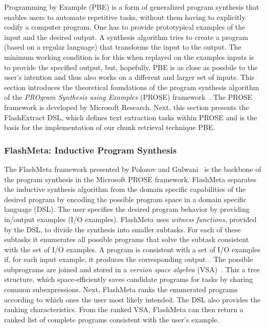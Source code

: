 Programming by Example (PBE) is a form of generalized program synthesis that enables users to automate repetitive tasks, without them having to explicitly codify a computer program. One has to provide prototypical examples of the input and the desired output. A
synthesis algorithm tries to create a program (based on a regular language) that transforms the input to the output. The minimum working condition is for this when replayed on the examples inputs is to provide the specified output, but, hopefully, PBE is as close as possbile to the user's intention and thus also works on a different and larger set of inputs.
This section introduces the theoretical foundations of the program synthesis
algorithm of the \emph{PROgram Synthesis using Examples} (PROSE) framework~\cite{prose2019webpage}.
The PROSE framework is developed by Microsoft Research.
Next, this section presents the FlashExtract DSL, which defines text extraction
tasks within PROSE and is the basis for the implementation of our chunk retrieval technique PBE\@.

\subsubsection{FlashMeta: Inductive Program Synthesis}
The FlashMeta framework presented by Polozov and Gulwani~\cite{polozov2015flashmeta:} is the backbone of the program synthesis in the Microsoft PROSE framework.
FlashMeta separates the inductive synthesis algorithm from the domain specific capabilities of the desired program by encoding the possible program space in a domain specific language (DSL).
The user specifies the desired program behavior by providing in/output examples (I/O examples).
FlashMeta uses \emph{witness functions}, provided by the DSL, to divide the synthesis into smaller subtasks.
For each of these subtasks it enumerates all possible programs that solve the subtask consistent with the set of I/O examples.
A program is consistent with a set of I/O examples if, for each input example, it produces the corresponding output~\cite{mitchell1982generalization}.
The possible subprograms are joined and stored in a \emph{version space algebra} (VSA)~\cite{mitchell1982generalization}.
This a tree structure, which space-efficiently saves candidate programs for tasks by sharing common subexpressions.
Next, FlashMeta ranks the enumerated programs according to which ones the user most likely intended.
The DSL also provides the ranking characteristics.
From the ranked VSA, FlashMeta can then return a ranked list of complete programs consistent with the user's example.

